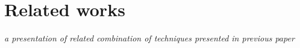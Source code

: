 
\section{Related works}
\label{sec:related}

\emph{a presentation of related combination of techniques presented in previous paper}